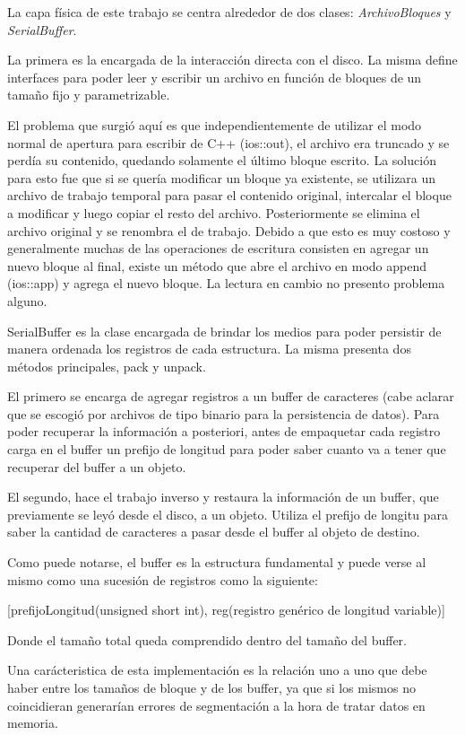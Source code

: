 \documentclass{article}
\begin{document}
	La capa física de este trabajo se centra alrededor de dos clases: \textit{ArchivoBloques} y \textit{SerialBuffer}.
	\par	
	La primera es la encargada de la interacción directa con el disco. La misma define interfaces para poder leer y escribir un archivo en función de bloques de un tamaño fijo y parametrizable.
	\par
	El problema que surgió aquí es que independientemente de utilizar el modo normal de apertura para escribir de C++ (ios::out), el archivo era truncado y se perdía su contenido, quedando solamente el último bloque escrito. La solución para esto fue que si se quería modificar un bloque ya existente, se utilizara un archivo de trabajo temporal para pasar el contenido original, intercalar el bloque a modificar y luego copiar el resto del archivo. Posteriormente se elimina el archivo original y se renombra el de trabajo. Debido a que esto es muy costoso y generalmente muchas de las operaciones de escritura consisten en agregar un nuevo bloque al final, existe un método que abre el archivo en modo append (ios::app) y agrega el nuevo bloque. La lectura en cambio no presento problema alguno.
	\par
	SerialBuffer es la clase encargada de brindar los medios para poder persistir de manera ordenada los registros de cada estructura. La misma presenta dos métodos principales, pack y unpack.
	\par
	El primero se encarga de agregar registros a un buffer de caracteres (cabe aclarar que se escogió por archivos de tipo binario para la persistencia de datos). Para poder recuperar la información a posteriori, antes de empaquetar cada registro carga en el buffer un prefijo de longitud para poder saber cuanto va a tener que recuperar del buffer a un objeto.
	\par
	El segundo, hace el trabajo inverso y restaura la información de un buffer, que previamente se leyó desde el disco, a un objeto. Utiliza el prefijo de longitu para saber la cantidad de caracteres a pasar desde el buffer al objeto de destino.
	\par
	Como puede notarse, el buffer es la estructura fundamental y puede verse al mismo como una sucesión de registros como la siguiente:
	\bigskip


	{\ttfamily\footnotesize
	[prefijoLongitud(unsigned short int), reg(registro genérico de longitud variable)] \\}
	\medskip


	Donde el tamaño total queda comprendido dentro del tamaño del buffer.
	\par
	Una carácteristica de esta implementación es la relación uno a uno que debe haber entre los tamaños de bloque y de los buffer, ya que si los mismos no coincidieran generarían errores de segmentación a la hora de tratar datos en memoria.	
	\bigskip
\end{document}
